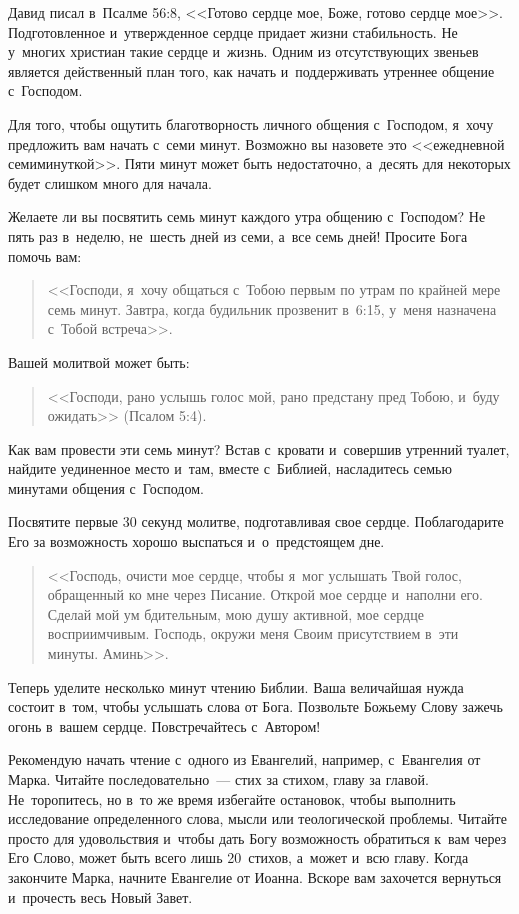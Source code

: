 \documentclass[12pt,article,a4paper,fittopage]{ncc}
\begin{document}
\begin{multicols}{2}
Давид писал в~Псалме 56:8, <<Готово сердце мое, Боже, готово сердце мое>>. Подготовленное и~утвержденное сердце придает жизни стабильность. Не у~многих христиан такие сердце и~жизнь. Одним из отсутствующих звеньев является действенный план того, как начать и~поддерживать утреннее общение с~Господом.

Для того, чтобы ощутить благотворность личного общения с~Господом, я~хочу предложить вам начать с~семи минут. Возможно вы назовете это <<ежедневной семиминуткой>>. Пяти минут может быть недостаточно, а~десять для некоторых будет слишком много для начала.

Желаете ли вы посвятить семь минут каждого утра общению с~Господом? Не пять раз в~неделю, не~шесть дней из семи, а~все семь дней! Просите Бога помочь вам: \begin{quote}
<<Господи, я~хочу общаться с~Тобою первым по утрам по крайней мере семь минут. Завтра, когда будильник прозвенит в~6:15, у~меня назначена с~Тобой встреча>>.
\end{quote}

Вашей молитвой может быть:

\begin{quote}
<<Господи, рано услышь голос мой, рано предстану пред Тобою, и~буду ожидать>> (Псалом 5:4).
\end{quote}

Как вам провести эти семь минут? Встав с~кровати и~совершив утренний туалет, найдите уединенное место и~там, вместе с~Библией, насладитесь семью минутами общения с~Господом.

Посвятите первые 30 секунд молитве, подготавливая свое сердце. Поблагодарите Его за возможность хорошо выспаться и~о~предстоящем дне. \begin{quote}<<Господь, очисти мое сердце, чтобы я~мог услышать Твой голос, обращенный ко мне через Писание. Открой мое сердце и~наполни его. Сделай мой ум бдительным, мою душу активной, мое сердце восприимчивым. Господь, окружи меня Своим присутствием в~эти минуты. Аминь>>.\end{quote}

Теперь уделите несколько минут чтению Библии. Ваша величайшая нужда состоит в~том, чтобы услышать слова от Бога. Позвольте Божьему Слову зажечь огонь в~вашем сердце. Повстречайтесь с~Автором!

Рекомендую начать чтение с~одного из Евангелий, например, с~Евангелия от Марка. Читайте последовательно~--- стих за стихом, главу за главой. Не~торопитесь, но в~то же время избегайте остановок, чтобы выполнить исследование определенного слова, мысли или теологической проблемы. Читайте просто для удовольствия и~чтобы дать Богу возможность обратиться к~вам через Его Слово, может быть всего лишь 20~стихов, а~может и~всю главу. Когда закончите Марка, начните Евангелие от Иоанна. Вскоре вам захочется вернуться и~прочесть весь Новый Завет.


\end{multicols}
\end{document}
